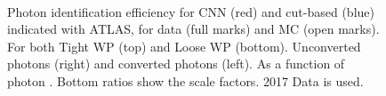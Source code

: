 \begin{figure}[ht]
    \centering
	 \\
    \caption{Photon identification efficiency for CNN (red) and cut-based (blue) indicated with ATLAS, for data (full marks) and MC (open marks). For both Tight WP (top) and Loose WP (bottom). Unconverted photons (right) and converted photons (left). As a function of photon \eT. Bottom ratios show the scale factors. 2017 Data is used.}
    \label{fig:gamma:CNN:Zllg:Energy}
\end{figure}

